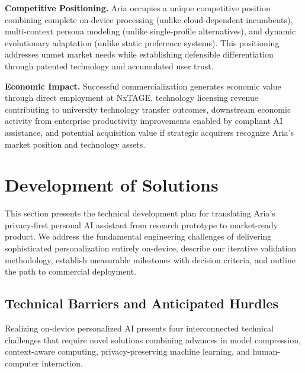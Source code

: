 \documentclass[11pt]{article}
\begin{document}
\textbf{Competitive Positioning.} Aria occupies a unique competitive position combining complete on-device processing (unlike cloud-dependent incumbents), multi-context persona modeling (unlike single-profile alternatives), and dynamic evolutionary adaptation (unlike static preference systems). This positioning addresses unmet market needs while establishing defensible differentiation through patented technology and accumulated user trust.

\textbf{Economic Impact.} Successful commercialization generates economic value through direct employment at NxTAGE, technology licensing revenue contributing to university technology transfer outcomes, downstream economic activity from enterprise productivity improvements enabled by compliant AI assistance, and potential acquisition value if strategic acquirers recognize Aria's market position and technology assets.


\vspace*{-8pt}
\section{Development of Solutions}
\label{sec:development}
\vspace*{-8pt}
This section presents the technical development plan for translating Aria's privacy-first personal AI assistant from research prototype to market-ready product. We address the fundamental engineering challenges of delivering sophisticated personalization entirely on-device, describe our iterative validation methodology, establish measurable milestones with decision criteria, and outline the path to commercial deployment.

\vspace*{-8pt}
\subsection{Technical Barriers and Anticipated Hurdles}
\vspace*{-8pt}
Realizing on-device personalized AI presents four interconnected technical challenges that require novel solutions combining advances in model compression, context-aware computing, privacy-preserving machine learning, and human-computer interaction.
\end{document}
